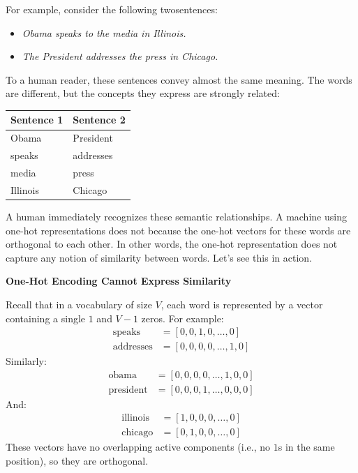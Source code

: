 \highspace
For example, consider the following twosentences:
\begin{itemize}
    \item \emph{Obama speaks to the media in Illinois.}
    \item \emph{The President addresses the press in Chicago.}
\end{itemize}
To a human reader, these sentences convey almost the same meaning. The words are different, but the concepts they express are strongly related:
\begin{center}
    \begin{tabular}{@{} l l @{}}
        \toprule
        \textbf{Sentence 1} & \textbf{Sentence 2} \\
        \midrule
        Obama & President \\
        speaks & addresses \\
        media & press \\
        Illinois & Chicago \\
        \bottomrule
    \end{tabular}
\end{center}

\noindent
A human immediately recognizes these semantic relationships. A machine using one-hot representations does not because the one-hot vectors for these words are orthogonal to each other. In other words, the one-hot representation does not capture any notion of similarity between words. Let's see this in action.

\highspace
\begin{flushleft}
    \textcolor{Red2}{ \textbf{One-Hot Encoding Cannot Express Similarity}}
\end{flushleft}
Recall that in a vocabulary of size $V$, each word is represented by a vector containing a single $1$ and $V-1$ zeros. For example:
\begin{align*}
    \text{speaks} &= [0, 0, 1, 0, \dots, 0] \\
    \text{addresses} &= [0, 0, 0, 0, \dots, 1, 0]
\end{align*}
Similarly:
\begin{align*}
    \text{obama} &= [0, 0, 0, 0, \dots, 1, 0, 0] \\
    \text{president} &= [0, 0, 0, 1, \dots, 0, 0, 0]
\end{align*}
And:
\begin{align*}
    \text{illinois} &= [1, 0, 0, 0, \dots, 0] \\
    \text{chicago} &= [0, 1, 0, 0, \dots, 0]
\end{align*}
These vectors have no overlapping active components (i.e., no $1$s in the same position), so they are orthogonal.

